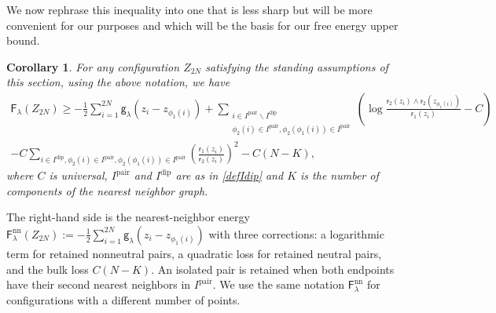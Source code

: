 \documentclass[a4paper,10pt,leqno]{amsart}
\numberwithin{equation}{section}
\newtheorem{coro}[prop]{Corollary}
\def\hal{\frac{1}{2}}
\def\g{\mathsf{g}}
\def\F{\mathsf{F}}
\def\rr{\mathsf{r}}
\newcommand{\dip}{\mathrm{dip}}
\def\pair{\mathrm{pair}}
\def\nn{\mathrm{nn}}
\begin{document}
We now rephrase this inequality into one that is less sharp but will be more convenient for our purposes and which will be the basis for our free energy upper bound.
\begin{coro}\label{coromino}
  For any configuration $Z_{2N}$ satisfying the standing assumptions of this section, using the above notation, we have
  \begin{multline}
    \label{minoF02 bis}
    \F_\lambda(Z_{2N})
    \ge - \hal \sum_{ i=1}^{2N} \g_\lambda(z_i-z_{\phi_1(i)} )+ \sum_{\substack{i\in I^{\pair}\backslash I^{\dip}\\ \phi_2(i) \in I^\pair, \phi_2(\phi_1(i)) \in I^\pair}}\left( \log
    \frac{\rr_2(z_i) \wedge \rr_2(z_{\phi_1(i)})}{\rr_1(z_i)}-C\right)
    \\
    - C \sum_{i \in I^{\dip}, \phi_2(i)\in I^\pair , \phi_2(\phi_1(i)) \in I^\pair}
    \left( \frac{\rr_1(z_i)}{\rr_2(z_i)}\right)^2
    - C (N-K),
  \end{multline}where $C$ is universal, $I^\pair$ and $I^\dip$ are as in \eqref{defIdip} and $K$ is the number of components of the nearest neighbor graph.
\end{coro}
The right-hand side is the nearest-neighbor energy $\F_\lambda^\nn(Z_{2N}):=-\hal\sum_{i=1}^{2N}\g_\lambda(z_i-z_{\phi_1(i)})$ with three corrections: a logarithmic term for retained nonneutral pairs, a quadratic loss for retained neutral pairs, and the bulk loss $C(N-K)$. An isolated pair is retained when both endpoints have their second nearest neighbors in $I^\pair$. We use the same notation $\F_\lambda^\nn$ for configurations with a different number of points.
\end{document}
